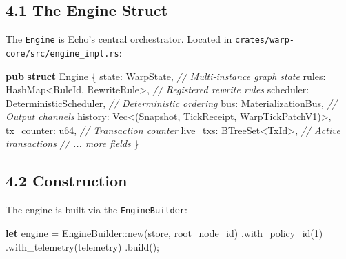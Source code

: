 \documentclass[
]{book}
\newenvironment{Shaded}{}{}
\newcommand{\CommentTok}[1]{\textcolor[rgb]{0.38,0.63,0.69}{\textit{#1}}}
\newcommand{\DataTypeTok}[1]{\textcolor[rgb]{0.56,0.13,0.00}{#1}}
\newcommand{\DecValTok}[1]{\textcolor[rgb]{0.25,0.63,0.44}{#1}}
\newcommand{\KeywordTok}[1]{\textcolor[rgb]{0.00,0.44,0.13}{\textbf{#1}}}
\newcommand{\NormalTok}[1]{#1}
\newcommand{\OperatorTok}[1]{\textcolor[rgb]{0.40,0.40,0.40}{#1}}
\newcommand{\PreprocessorTok}[1]{\textcolor[rgb]{0.74,0.48,0.00}{#1}}
\begin{document}
\subsection{4.1 The Engine Struct}\label{the-engine-struct}

The \texttt{Engine} is Echo's central orchestrator. Located in
\texttt{crates/warp-core/src/engine\_impl.rs}:

\begin{Shaded}
\begin{Highlighting}[]
\KeywordTok{pub} \KeywordTok{struct}\NormalTok{ Engine }\OperatorTok{\{}
\NormalTok{    state}\OperatorTok{:}\NormalTok{ WarpState}\OperatorTok{,}                           \CommentTok{// Multi{-}instance graph state}
\NormalTok{    rules}\OperatorTok{:}\NormalTok{ HashMap}\OperatorTok{\textless{}}\NormalTok{RuleId}\OperatorTok{,}\NormalTok{ RewriteRule}\OperatorTok{\textgreater{},}        \CommentTok{// Registered rewrite rules}
\NormalTok{    scheduler}\OperatorTok{:}\NormalTok{ DeterministicScheduler}\OperatorTok{,}          \CommentTok{// Deterministic ordering}
\NormalTok{    bus}\OperatorTok{:}\NormalTok{ MaterializationBus}\OperatorTok{,}                    \CommentTok{// Output channels}
\NormalTok{    history}\OperatorTok{:} \DataTypeTok{Vec}\OperatorTok{\textless{}}\NormalTok{(Snapshot}\OperatorTok{,}\NormalTok{ TickReceipt}\OperatorTok{,}\NormalTok{ WarpTickPatchV1)}\OperatorTok{\textgreater{},}
\NormalTok{    tx\_counter}\OperatorTok{:} \DataTypeTok{u64}\OperatorTok{,}                            \CommentTok{// Transaction counter}
\NormalTok{    live\_txs}\OperatorTok{:}\NormalTok{ BTreeSet}\OperatorTok{\textless{}}\NormalTok{TxId}\OperatorTok{\textgreater{},}                   \CommentTok{// Active transactions}
    \CommentTok{// ... more fields}
\OperatorTok{\}}
\end{Highlighting}
\end{Shaded}

\subsection{4.2 Construction}\label{construction}

The engine is built via the \texttt{EngineBuilder}:

\begin{Shaded}
\begin{Highlighting}[]
\KeywordTok{let}\NormalTok{ engine }\OperatorTok{=} \PreprocessorTok{EngineBuilder::}\NormalTok{new(store}\OperatorTok{,}\NormalTok{ root\_node\_id)}
    \OperatorTok{.}\NormalTok{with\_policy\_id(}\DecValTok{1}\NormalTok{)}
    \OperatorTok{.}\NormalTok{with\_telemetry(telemetry)}
    \OperatorTok{.}\NormalTok{build()}\OperatorTok{;}
\end{Highlighting}
\end{Shaded}
\end{document}
